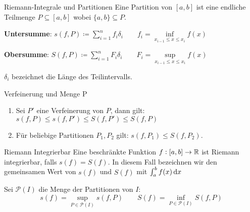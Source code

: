 \begin{definition}{Riemann-Integrale und Partitionen}
    Eine Partition von $[a,b]$ ist eine endliche Teilmenge $P \subseteq [a,b]$ wobei $\{a,b\} \subseteq P$.

    \textbf{Untersumme}: $s(f,P) \coloneqq \sum_{i=1}^n f_i \delta_i \qquad f_i = \inf\limits_{x_{i-1} \leq x \leq x_i} f(x)$

    \textbf{Obersumme}: $S(f,P) \coloneqq \sum_{i=1}^n F_i \delta_i \qquad F_i = \sup\limits_{x_{i-1} \leq x \leq x_i} f(x)$

    $\delta_i$ bezeichnet die Länge des Teilintervalls.
\end{definition}

\begin{lemma}{Verfeinerung und Menge P}
    \begin{enumerate}
        \item Sei $P'$ eine Verfeinerung von $P$, dann gilt:
            $s(f,P) \leq s (f,P') \leq S(f,P') \leq S(f, P)$
        \item Für beliebige Partitionen $P_1, P_2$ gilt: $s(f,P_1) \leq S(f,P_2)$.
    \end{enumerate}
\end{lemma}

\begin{definition}{Riemann Integrierbar}
    Eine beschränkte Funktion $f : [a,b] \to \mathbb{R}$ ist Riemann integrierbar, falls $s(f) = S(f)$. In diesem Fall bezeichnen wir den gemeinsamen Wert von $s(f)$ und $S(f)$ mit
    $\int_{a}^{b} f(x) \dif x$

    Sei $\mathcal{P}(I)$ die Menge der Partitionen von $I$:
    \begin{equation}
        s(f) = \sup_{P \in \mathcal{P}(I)} s(f,P) \qquad S(f) = \inf_{P \in \mathcal{P}(I)} S(f,P)
    \end{equation}
\end{definition}

